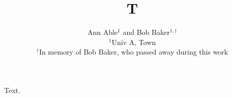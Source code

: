 \documentclass{article}
\title{T}
\author{Ann Able$^{1}$ and Bob Baker$^{1,\dagger}$\\
$^1$Univ A, Town\\
$^\dagger$In memory of Bob Baker, who passed away during this work}
\date{}
\begin{document}
\maketitle
Text.
\end{document}
